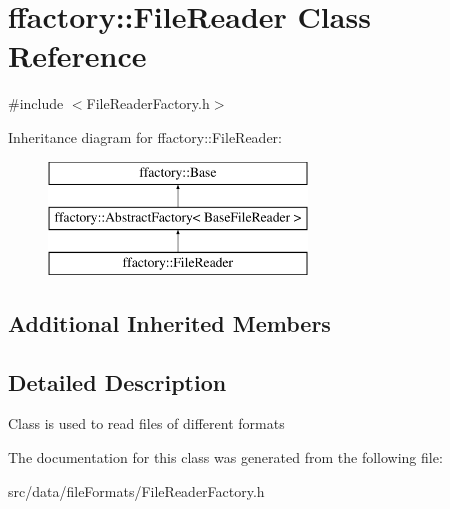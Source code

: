 \hypertarget{classffactory_1_1_file_reader}{\section{ffactory\-:\-:File\-Reader Class Reference}
\label{classffactory_1_1_file_reader}
}


{\ttfamily \#include $<$File\-Reader\-Factory.\-h$>$}

Inheritance diagram for ffactory\-:\-:File\-Reader\-:\begin{figure}[H]
\begin{center}
\leavevmode
\includegraphics[height=3.000000cm]{classffactory_1_1_file_reader}
\end{center}
\end{figure}
\subsection*{Additional Inherited Members}


\subsection{Detailed Description}
Class is used to read files of different formats 

The documentation for this class was generated from the following file\-:\begin{DoxyCompactItemize}
\item 
src/data/file\-Formats/File\-Reader\-Factory.\-h\end{DoxyCompactItemize}
